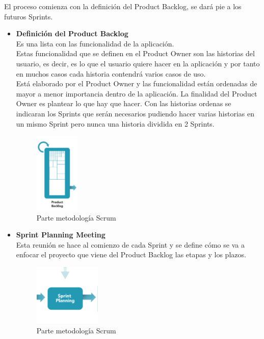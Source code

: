 El proceso comienza con la definición del Product Backlog, se dará pie a los futuros Sprints.
\begin{itemize}
\item \textbf{Definición del Product Backlog}\\
Es una lista con las funcionalidad de la aplicación.\\
Estas funcionalidad que se definen en el Product Owner son las historias del usuario, es decir, es lo que el usuario quiere hacer en la aplicación y por tanto en muchos casos cada historia contendrá varios casos de uso. \\
Está elaborado por el Product Owner y las funcionalidad están ordenadas de mayor a menor importancia dentro de la aplicación. La finalidad del Product Owner es plantear lo que hay que hacer.
Con las historias ordenas se indicaran los Sprints que serán necesarios pudiendo hacer  varias historias en un mismo Sprint pero nunca una historia dividida en 2 Sprints. 

 
 \begin{figure}[H]
		\centering
		\includegraphics[width=0.2\textwidth] {product.png}
		\caption{Parte metodología Scrum }
	\end{figure} 


\item \textbf{Sprint Planning Meeting}\\
 Esta reunión se hace al comienzo de cada Sprint y se define cómo se va a enfocar el proyecto que viene del Product Backlog las etapas y los plazos.
\begin{figure}[H]
		\centering
		\includegraphics[width=0.3\textwidth] {planing.png}
		\caption{Parte metodología Scrum }
	\end{figure} 


\end{itemize}
